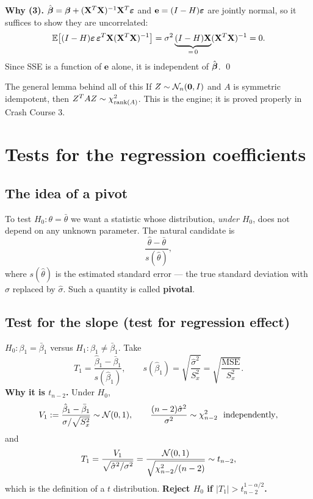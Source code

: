 \documentclass[11pt]{article}
\begin{document}
\textbf{Why (3).} $\hat{\boldsymbol{\beta}} = \boldsymbol{\beta} + (\mathbf{X}^T\mathbf{X})^{-1}\mathbf{X}^T\boldsymbol{\varepsilon}$ and $\mathbf{e}=(I-H)\boldsymbol{\varepsilon}$ are
jointly normal, so it suffices to show they are uncorrelated:
\[
  \mathbb{E}\big[(I-H)\boldsymbol{\varepsilon}\,\boldsymbol{\varepsilon}^T\mathbf{X}(\mathbf{X}^T\mathbf{X})^{-1}\big]
  = \sigma^2 \underbrace{(I-H)\mathbf{X}}_{=\,0}(\mathbf{X}^T\mathbf{X})^{-1} = 0 .
\]
Since SSE is a function of $\mathbf{e}$ alone, it is independent of $\hat{\boldsymbol{\beta}}$. \qed

\begin{idea}{The general lemma behind all of this}
If $Z\sim \mathcal{N}_n(\mathbf{0},I)$ and $A$ is symmetric idempotent, then
$Z^TAZ\sim \chi^2_{\operatorname{rank}(A)}$. This is the engine; it is proved properly in Crash Course 3.
\end{idea}

\section{Tests for the regression coefficients}

\subsection{The idea of a pivot}

To test $H_0:\theta=\bar\theta$ we want a statistic whose distribution, \emph{under $H_0$},
does not depend on any unknown parameter. The natural candidate is
\[
  \frac{\hat\theta-\bar\theta}{s(\hat\theta)} ,
\]
where $s(\hat\theta)$ is the estimated standard error --- the true standard deviation with
$\sigma$ replaced by $\hat\sigma$. Such a quantity is called \textbf{pivotal}.

\subsection{Test for the slope (test for regression effect)}

$H_0:\beta_1=\bar\beta_1$ versus $H_1:\beta_1\neq\bar\beta_1$. Take
\[
  T_1 = \frac{\hat\beta_1-\bar\beta_1}{s(\hat\beta_1)},
  \qquad s(\hat\beta_1)=\sqrt{\frac{\hat\sigma^2}{S_x^2}} = \sqrt{\frac{\mathrm{MSE}}{S_x^2}} .
\]
\textbf{Why it is $t_{n-2}$.} Under $H_0$,
\[
  V_1 := \frac{\hat\beta_1-\bar\beta_1}{\sigma/\sqrt{S_x^2}} \sim \mathcal{N}(0,1),
  \qquad
  \frac{(n-2)\hat\sigma^2}{\sigma^2}\sim\chi^2_{n-2}\ \text{ independently},
\]
and
\[
  T_1 = \frac{V_1}{\sqrt{\hat\sigma^2/\sigma^2}}
      = \frac{\mathcal{N}(0,1)}{\sqrt{\chi^2_{n-2}/(n-2)}} \sim t_{n-2},
\]
which is the definition of a $t$ distribution. \textbf{Reject $H_0$ if
$|T_1| > t^{1-\alpha/2}_{n-2}$.}
\end{document}
